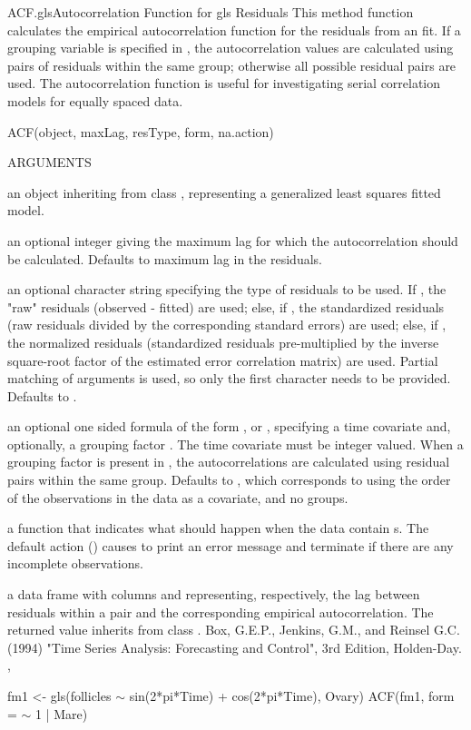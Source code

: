\documentclass[pdftex]{article} \usepackage{url,graphicx}
\renewcommand{\Twiddle}{\mbox{\(\sim\)}}
\begin{document}
\begin{Helpfile}{ACF.gls}{Autocorrelation Function for gls Residuals}
This method function calculates the empirical autocorrelation function
for the residuals from an  fit. If a grouping variable is
specified in , the autocorrelation values
are calculated using pairs of residuals within the same group;
otherwise all possible residual pairs are used. The autocorrelation
function is useful for investigating serial correlation models for
equally spaced data.
\begin{Example}
ACF(object, maxLag, resType, form, na.action)
\end{Example}
\begin{Argument}{ARGUMENTS}
\item[\Co{object:}]
an object inheriting from class , representing
a generalized least squares fitted  model.
\item[\Co{maxLag:}]
an optional integer giving the maximum lag for which the
autocorrelation should be calculated. Defaults to maximum lag in the
residuals.
\item[\Co{resType:}]
an optional character string specifying the type of
residuals to be used. If , the "raw" residuals
(observed - fitted) are used; else, if , the
standardized residuals (raw residuals divided by the corresponding
standard errors) are used; else, if , the
normalized residuals (standardized residuals pre-multiplied by the
inverse square-root factor of the estimated error correlation
matrix) are used. Partial matching of arguments is used, so only the
first character needs to be provided. Defaults to .
\item[\Co{form:}]
an optional one sided formula of the form \Co{{\Twiddle} t}, or
\Co{{\Twiddle} t | g}, specifying a time covariate  and,  optionally, a
grouping factor . The time covariate must be integer
valued. When a grouping factor is present in 
, the autocorrelations are calculated using residual pairs
within the same group. Defaults to \Co{{\Twiddle} 1}, which corresponds to
using the order of the observations in the data as a covariate, and
no groups.
\item[\Co{na.action:}]
a function that indicates what should happen when the
data contain s.  The default action () causes
 to print an error message and terminate if there are any
incomplete observations.
\end{Argument}
a data frame with columns  and  representing,
respectively, the lag between residuals within a pair and the corresponding
empirical autocorrelation. The returned value inherits from class
.
Box, G.E.P., Jenkins, G.M., and Reinsel G.C. (1994) "Time Series
Analysis: Forecasting and Control", 3rd Edition, Holden-Day.
, 
\need 15pt
\vspace{-16pt}
\begin{Example}
fm1 <- gls(follicles {\Twiddle} sin(2*pi*Time) + cos(2*pi*Time), Ovary)
ACF(fm1, form = {\Twiddle} 1 | Mare)
\end{Example}
\end{Helpfile}
\end{document}
